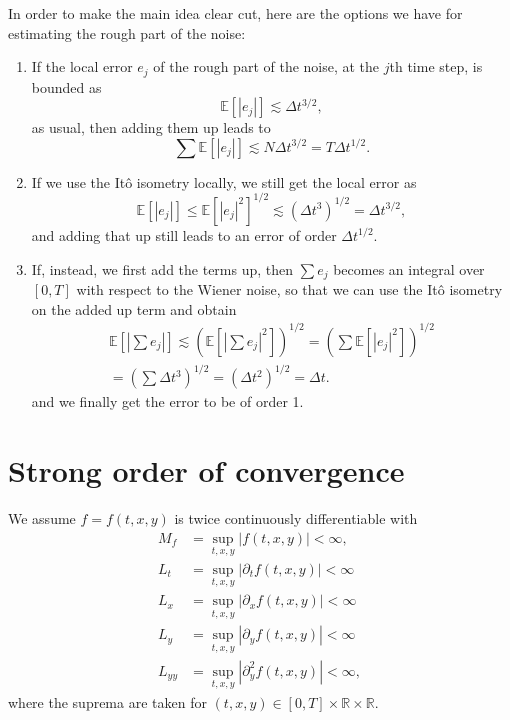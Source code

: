 \documentclass[reqno,12pt]{amsart}
\theoremstyle{plain}%
\theoremstyle{definition}
\begin{document}
In order to make the main idea clear cut, here are the options we have for estimating the rough part of the noise:
\begin{enumerate}
  \item If the local error $e_j$ of the rough part of the noise, at the $j$th time step, is bounded as
    $$
    \mathbb{E}[|e_j|] \lesssim \Delta t^{3/2},
    $$
    as usual, then adding them up leads to 
    $$
      \sum \mathbb{E}[|e_j|] \lesssim N\Delta t^{3/2} = T\Delta t^{1/2}.
    $$
    \item If we use the It\^o isometry locally, we still get the local error as
    $$
      \mathbb{E}[|e_j|] \leq \mathbb{E}[|e_j|^2]^{1/2} \lesssim \left(\Delta t^3 \right)^{1/2} = \Delta t^{3/2},
    $$
    and adding that up still leads to an error of order $\Delta t^{1/2}$.
    \item If, instead, we first add the terms up, then $\sum e_j$ becomes an integral over $[0, T]$ with respect to the Wiener noise, so that we can use the It\^o isometry on the added up term and obtain
    \begin{multline*}
      \mathbb{E}\left[ \left| \sum e_j \right| \right] \lesssim \left(\mathbb{E}\left[ \left| \sum e_j \right|^2 \right]\right)^{1/2} = \left( \sum \mathbb{E}[|e_j|^2] \right)^{1/2} \\
      = \left( \sum \Delta t^3 \right)^{1/2} = \left( \Delta t^2 \right)^{1/2} = \Delta t.
    \end{multline*}
    and we finally get the error to be of order 1.
\end{enumerate}

\section{Strong order of convergence}

We assume $f=f(t, x, y)$ is twice continuously differentiable with
\begin{align}
  \label{Mfassumption} M_f & = \sup_{t, x, y} |f(t, x, y)| < \infty, \\
  \label{Ltassumption} L_t & = \sup_{t, x, y} |\partial_t f(t, x, y)| < \infty \\
  \label{Lxassumption} L_x & = \sup_{t, x, y} |\partial_x f(t, x, y)| < \infty \\
  \label{Lyassumption} L_y & = \sup_{t, x, y} |\partial_y f(t, x, y)| < \infty \\
  \label{Lyyassumption} L_{yy} & = \sup_{t, x, y} |\partial_y^2 f(t, x, y)| < \infty,
\end{align}
where the suprema are taken for $(t, x, y) \in [0, T] \times \mathbb{R} \times \mathbb{R}$.
\end{document}
